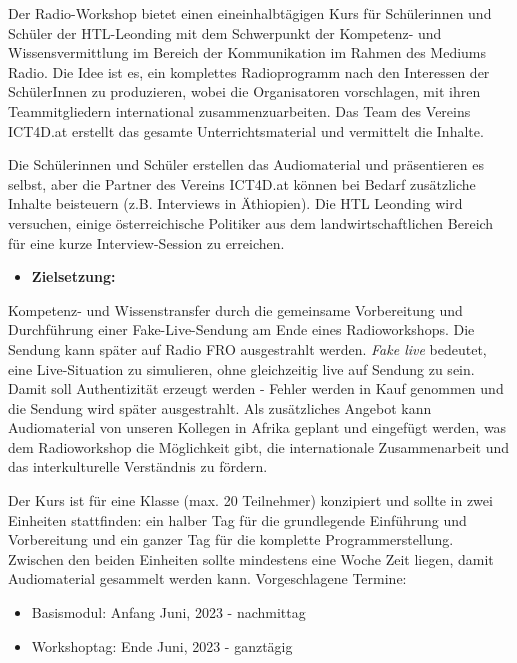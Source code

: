Der Radio-Workshop bietet einen eineinhalbtägigen Kurs für Schülerinnen und Schüler der HTL-Leonding mit dem Schwerpunkt der Kompetenz- und Wissensvermittlung im Bereich der Kommunikation im Rahmen des Mediums Radio. Die Idee ist es, ein komplettes Radioprogramm nach den Interessen der SchülerInnen zu produzieren, wobei die Organisatoren vorschlagen, mit ihren Teammitgliedern international zusammenzuarbeiten. Das Team des Vereins ICT4D.at erstellt das gesamte Unterrichtsmaterial und vermittelt die Inhalte.

Die Schülerinnen und Schüler erstellen das Audiomaterial und präsentieren es selbst, aber die Partner des Vereins ICT4D.at können bei Bedarf zusätzliche Inhalte beisteuern (z.B. Interviews in Äthiopien). Die HTL Leonding wird versuchen, einige österreichische Politiker aus dem landwirtschaftlichen Bereich für eine kurze Interview-Session zu erreichen.

\begin{itemize}
    \item \textbf{Zielsetzung:}
\end{itemize}

Kompetenz- und Wissenstransfer durch die
gemeinsame Vorbereitung und Durchführung einer Fake-Live-Sendung am Ende eines Radioworkshops. Die Sendung kann später auf Radio FRO ausgestrahlt werden. \textit{Fake live} bedeutet, eine Live-Situation zu simulieren, ohne gleichzeitig live auf Sendung zu sein. Damit soll Authentizität erzeugt werden - Fehler werden in Kauf genommen und die Sendung wird später ausgestrahlt. Als zusätzliches Angebot kann Audiomaterial von unseren Kollegen in Afrika geplant und eingefügt werden, was dem Radioworkshop die Möglichkeit gibt, die internationale Zusammenarbeit und das interkulturelle Verständnis zu fördern.

Der Kurs ist für eine Klasse (max. 20 Teilnehmer) konzipiert und sollte in zwei Einheiten stattfinden: ein halber Tag für die grundlegende Einführung und Vorbereitung und ein ganzer Tag für die komplette Programmerstellung. Zwischen den beiden Einheiten sollte mindestens eine Woche Zeit liegen, damit Audiomaterial gesammelt werden kann.
Vorgeschlagene Termine:

\begin{itemize}
    \item {Basismodul: Anfang Juni, 2023 - nachmittag}
    \item {Workshoptag: Ende Juni, 2023 - ganztägig}
\end{itemize}


